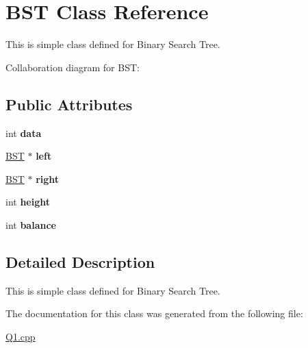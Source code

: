 \hypertarget{classBST}{}\section{B\+ST Class Reference}
\label{classBST}


This is simple class defined for Binary Search Tree.  




Collaboration diagram for B\+ST\+:
\subsection*{Public Attributes}
\begin{DoxyCompactItemize}
\item 
\mbox{\label{classBST_a90502ff1a482220bfdd92a7c67eb0a70}} 
int {\bfseries data}
\item 
\mbox{\label{classBST_a8dc8995eac57d83f70d77761aa029f2c}} 
\hyperlink{classBST}{B\+ST} $\ast$ {\bfseries left}
\item 
\mbox{\label{classBST_a49e8a6ec97a4c6b0a74114098cbff90f}} 
\hyperlink{classBST}{B\+ST} $\ast$ {\bfseries right}
\item 
\mbox{\label{classBST_a05b2d5fdf6364eedcfb5ad05109e1fac}} 
int {\bfseries height}
\item 
\mbox{\label{classBST_a666717c3e0d94fa4d338b98308fb92b4}} 
int {\bfseries balance}
\end{DoxyCompactItemize}


\subsection{Detailed Description}
This is simple class defined for Binary Search Tree. 

The documentation for this class was generated from the following file\+:\begin{DoxyCompactItemize}
\item 
\hyperlink{Q1_8cpp}{Q1.\+cpp}\end{DoxyCompactItemize}
